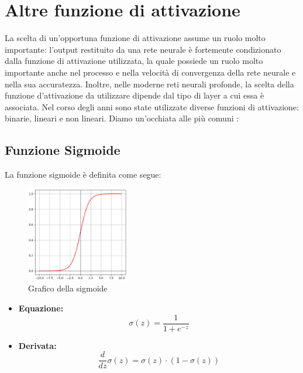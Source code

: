 \section{Altre funzione di attivazione}
La scelta di un’opportuna funzione di attivazione assume un ruolo molto importante:
l’output restituito da una rete neurale è fortemente condizionato dalla funzione di
attivazione utilizzata, la quale possiede un ruolo molto importante anche nel processo
e nella velocità di convergenza della rete neurale e nella sua accuratezza.
Inoltre, nelle moderne reti neurali profonde, la scelta della funzione d’attivazione da
utilizzare dipende dal tipo di layer a cui essa è associata. Nel corso degli anni sono
state utilizzate diverse funzioni di attivazione: binarie, lineari e non lineari. Diamo
un’occhiata alle più comuni 
\cite{ActivationFunctions_NetAI,ALL_DEEP_LEARNING, ActivationFunctions_MEDIUM}:

\subsection{Funzione Sigmoide}
La funzione sigmoide è definita come segue:

\begin{multicols}{2}
    {
        \begin{figure}[H]
            \centering
            \includegraphics[width=0.40\textwidth]{Immagini/Grafici/graficoSigmoide.png}
            \caption{Grafico della sigmoide}
        \end{figure}
    }
    {
        \begin{itemize}
            \item \textbf{Equazione:}
            \begin{equation}
                \sigma(z) = \frac{1}{1 + e^{-z}}
            \end{equation}
                
            \item \textbf{Derivata:}
            \begin{equation}
                \frac{d}{dz}\sigma(z)  = \sigma(z) \cdot (1 - \sigma(z))
            \end{equation}
        \end{itemize}
    }
\end{multicols}

